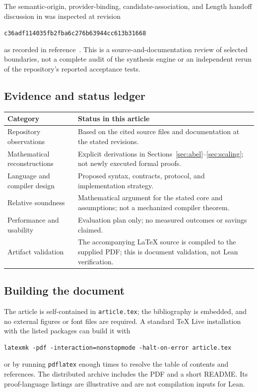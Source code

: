 \documentclass[11pt,a4paper]{article}
\newcommand{\code}[1]{\texttt{#1}}
\theoremstyle{remark}
\begin{document}
The semantic-origin, provider-binding, candidate-association, and Length handoff discussion in  was inspected at revision\par\smallskip\centerline{\small\texttt{c36adf114035fb2fba6c276b63944cc613b31668}}\smallskip\noindent as recorded in reference~\cite{leant-internals}. This is a source-and-documentation review of selected boundaries, not a complete audit of the synthesis engine or an independent rerun of the repository's reported acceptance tests.

\subsection{Evidence and status ledger}

\begin{tabularx}{\textwidth}{@{}p{}X@{}}
\toprule
Category & Status in this article \\
\midrule
Repository observations & Based on the cited source files and documentation at the stated revisions. \\
Mathematical reconstructions & Explicit derivations in Sections~\ref{sec:abel}--\ref{sec:scaling}; not newly executed formal proofs. \\
Language and compiler design & Proposed syntax, contracts, protocol, and implementation strategy. \\
Relative soundness & Mathematical argument for the stated core and assumptions; not a mechanized compiler theorem. \\
Performance and usability & Evaluation plan only; no measured outcomes or savings claimed. \\
Artifact validation & The accompanying \LaTeX{} source is compiled to the supplied PDF; this is document validation, not Lean verification. \\
\bottomrule
\end{tabularx}

\subsection{Building the document}

The article is self-contained in \code{article.tex}; the bibliography is embedded, and no external figures or font files are required. A standard TeX Live installation with the listed packages can build it with
\begin{lstlisting}
latexmk -pdf -interaction=nonstopmode -halt-on-error article.tex
\end{lstlisting}
or by running \code{pdflatex} enough times to resolve the table of contents and references. The distributed archive includes the PDF and a short README. Its proof-language listings are illustrative and are not compilation inputs for Lean.
\end{document}
